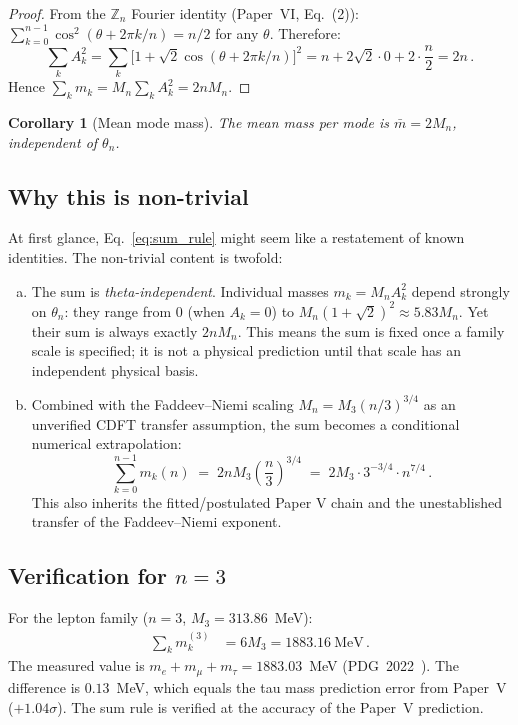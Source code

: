 \documentclass[11pt]{article}
\newtheorem{corollary}{Corollary}
\begin{document}
\begin{proof}
  From the $\mathbb{Z}_n$ Fourier identity (Paper~VI, Eq.~(2)):
  $\sum_{k=0}^{n-1} \cos^2(\theta + 2\pi k/n) = n/2$ for any $\theta$.
  Therefore:
  \[
    \sum_k A_k^2
    = \sum_k \bigl[1 + \sqrt{2}\cos(\theta + 2\pi k/n)\bigr]^2
    = n + 2\sqrt{2}\cdot 0 + 2\cdot\frac{n}{2} = 2n\,.
  \]
  Hence $\sum_k m_k = M_n \sum_k A_k^2 = 2nM_n$.
\end{proof}

\begin{corollary}[Mean mode mass]
  The mean mass per mode is $\bar{m} = 2M_n$, independent of $\theta_n$.
\end{corollary}

\subsection{Why this is non-trivial}

At first glance, Eq.~\eqref{eq:sum_rule} might seem like a restatement of
known identities.
The non-trivial content is twofold:
\begin{enumerate}[(a)]
  \item The sum is \emph{theta-independent}.
    Individual masses $m_k = M_n A_k^2$ depend strongly on $\theta_n$:
    they range from $0$ (when $A_k = 0$) to $M_n(1+\sqrt{2})^2 \approx 5.83 M_n$.
    Yet their sum is always exactly $2nM_n$.
    This means the sum is fixed once a family scale is specified; it is not a
    physical prediction until that scale has an independent physical basis.

  \item Combined with the Faddeev--Niemi scaling $M_n = M_3(n/3)^{3/4}$
    as an unverified CDFT transfer assumption, the sum becomes a conditional
    numerical extrapolation:
    \begin{equation}
      \sum_{k=0}^{n-1} m_k(n)
      \;=\; 2n M_3 \left(\frac{n}{3}\right)^{3/4}
      \;=\; 2M_3 \cdot 3^{-3/4} \cdot n^{7/4}\,.
      \label{eq:sum_n74}
    \end{equation}
    This also inherits the fitted/postulated Paper V chain and the unestablished
    transfer of the Faddeev--Niemi exponent.
\end{enumerate}

\subsection{Verification for $n = 3$}

For the lepton family ($n = 3$, $M_3 = 313.86$~MeV):
\begin{align}
  \sum_k m_k^{(3)} &= 6 M_3 = 1883.16~\text{MeV}\,.
  \label{eq:sum_3}
\end{align}
The measured value is $m_e + m_\mu + m_\tau = 1883.03$~MeV (PDG~2022~\cite{PDG2022}).
The difference is $0.13$~MeV, which equals the tau mass prediction error
from Paper~V ($+1.04\sigma$).
The sum rule is verified at the accuracy of the Paper~V prediction.
\end{document}
